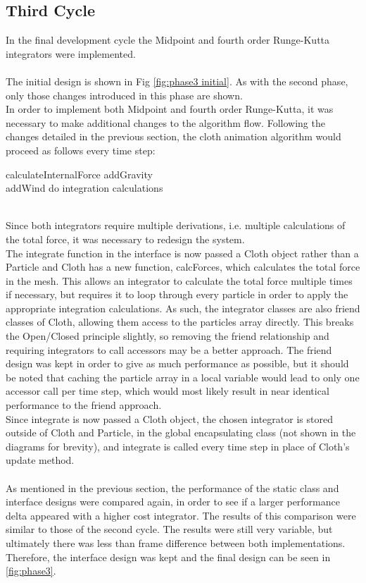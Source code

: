 \subsection{Third Cycle}
In the final development cycle the Midpoint and fourth order Runge-Kutta integrators were implemented.
\\\\The initial design is shown in Fig \ref{fig:phase3 initial}. As with the second phase, only those changes introduced in this phase are shown.
\\In order to implement both Midpoint and fourth order Runge-Kutta, it was necessary to make additional changes to the algorithm flow. Following the changes detailed in the previous section, the cloth animation algorithm would proceed as follows every time step:
\begin{algorithm}[h]
  \SetAlgoLined
  \SetNoFillComment
   {
    calculateInternalForce
  }
   {
    addGravity
    \\ {
      addWind
    }
    do integration calculations
  }
\end{algorithm}
\\Since both integrators require multiple derivations, i.e. multiple calculations of the total force, it was necessary to redesign the system.
\\The integrate function in the interface is now passed a Cloth object rather than a Particle and Cloth has a new function, calcForces, which calculates the total force in the mesh. This allows an integrator to calculate the total force multiple times if necessary, but requires it to loop through every particle in order to apply the appropriate integration calculations. As such, the integrator classes are also friend classes of Cloth, allowing them access to the particles array directly. This breaks the Open/Closed principle slightly, so removing the friend relationship and requiring integrators to call accessors may be a better approach. The friend design was kept in order to give as much performance as possible, but it should be noted that caching the particle array in a local variable would lead to only one accessor call per time step, which would most likely result in near identical performance to the friend approach.
\\Since integrate is now passed a Cloth object, the chosen integrator is stored outside of Cloth and Particle, in the global encapsulating class (not shown in the diagrams for brevity), and integrate is called every time step in place of Cloth's update method.
\\\\As mentioned in the previous section, the performance of the static class and interface designs were compared again, in order to see if a larger performance delta appeared with a higher cost integrator. The results of this comparison were similar to those of the second cycle. The results were still very variable, but ultimately there was less than frame difference between both implementations. Therefore, the interface design was kept and the final design can be seen in \ref{fig:phase3}.

